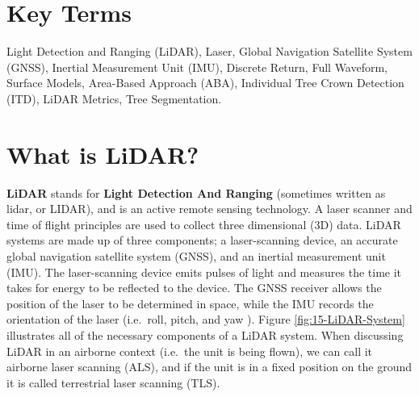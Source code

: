 \documentclass[
]{book}
\begin{document}
\hypertarget{key-terms-14}{%
\section*{Key Terms}\label{key-terms-14}}

Light Detection and Ranging (LiDAR), Laser, Global Navigation Satellite System (GNSS), Inertial Measurement Unit (IMU), Discrete Return, Full Waveform, Surface Models, Area-Based Approach (ABA), Individual Tree Crown Detection (ITD), LiDAR Metrics, Tree Segmentation.

\hypertarget{what-is-lidar}{%
\section{What is LiDAR?}\label{what-is-lidar}}

\textbf{LiDAR} stands for \textbf{Light Detection And Ranging} (sometimes written as lidar, or LIDAR), and is an active remote sensing technology. A laser scanner and time of flight principles are used to collect three dimensional (3D) data. LiDAR systems are made up of three components; a laser-scanning device, an accurate global navigation satellite system (GNSS), and an inertial measurement unit (IMU). The laser-scanning device emits pulses of light and measures the time it takes for energy to be reflected to the device. The GNSS receiver allows the position of the laser to be determined in space, while the IMU records the orientation of the laser (i.e.~roll, pitch, and yaw \citep{white_best_2013}). Figure \ref{fig:15-LiDAR-System} illustrates all of the necessary components of a LiDAR system. When discussing LiDAR in an airborne context (i.e.~the unit is being flown), we can call it airborne laser scanning (ALS), and if the unit is in a fixed position on the ground it is called terrestrial laser scanning (TLS).
\end{document}
